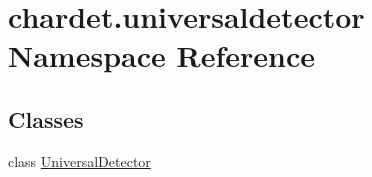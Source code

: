 \hypertarget{namespacechardet_1_1universaldetector}{}\section{chardet.\+universaldetector Namespace Reference}
\label{namespacechardet_1_1universaldetector}
\subsection*{Classes}
\begin{DoxyCompactItemize}
\item 
class \hyperlink{classchardet_1_1universaldetector_1_1_universal_detector}{Universal\+Detector}
\end{DoxyCompactItemize}

